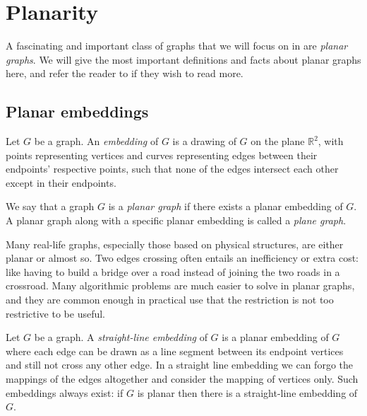 \section{Planarity}
\label{section:planar-graphs}
A fascinating and important class of graphs that we will focus on in  are \emph{planar graphs}. We will give the most important definitions and facts about planar graphs here, and refer the reader to \cite{source:planar_graphs} if they wish to read more.

\subsection{Planar embeddings}
\begin{definition}[Embedding]
    Let $G$ be a graph. An \emph{embedding} of $G$ is a drawing of $G$ on the plane $\mathbb{R}^2$, with points representing vertices and curves representing edges between their endpoints' respective points, such that none of the edges intersect each other except in their endpoints.
\end{definition}

\begin{definition}
    We say that a graph $G$ is a \emph{planar graph} if there exists a planar embedding of $G$. A planar graph along with a specific planar embedding is called a \emph{plane graph}.
\end{definition}

Many real-life graphs, especially those based on physical structures, are either planar or almost so. Two edges crossing often entails an inefficiency or extra cost: like having to build a bridge over a road instead of joining the two roads in a crossroad. Many algorithmic problems are much easier to solve in planar graphs, and they are common enough in practical use that the restriction is not too restrictive to be useful.

\begin{definition}
    Let $G$ be a graph. A \emph{straight-line embedding} of $G$ is a planar embedding of $G$ where each edge can be drawn as a line segment between its endpoint vertices and still not cross any other edge. In a straight line embedding we can forgo the mappings of the edges altogether and consider the mapping of vertices only. Such embeddings always exist: if $G$ is planar then there is a straight-line embedding of $G$.
\end{definition}

